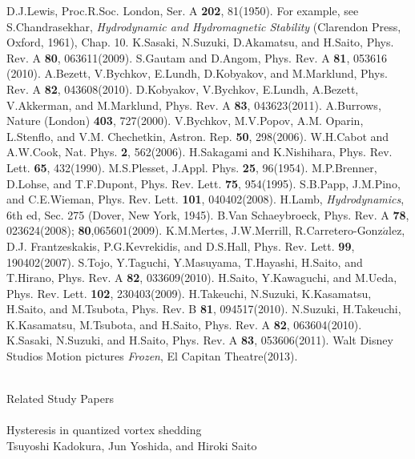 \documentclass[12pt,a4paper]{jbook}
\begin{document}
\begin{thebibliography}{81}
 D.J.Lewis, Proc.R.Soc. London, Ser. A {\bf 202}, 81(1950).
 For example, see S.Chandrasekhar, {\it Hydrodynamic and Hydromagnetic Stability} (Clarendon Press, Oxford, 1961), Chap. 10.
 K.Sasaki, N.Suzuki, D.Akamatsu, and H.Saito, Phys. Rev. A {\bf 80}, 063611(2009).
 S.Gautam and D.Angom, Phys. Rev. A {\bf 81}, 053616 (2010).
 A.Bezett, V.Bychkov, E.Lundh, D.Kobyakov, and M.Marklund, Phys. Rev. A {\bf 82}, 043608(2010).
 D.Kobyakov, V.Bychkov, E.Lundh, A.Bezett, V.Akkerman, and M.Marklund, Phys. Rev. A {\bf 83}, 043623(2011).
 A.Burrows, Nature (London) {\bf 403}, 727(2000).
 V.Bychkov, M.V.Popov, A.M. Oparin, L.Stenflo, and V.M. Chechetkin, Astron. Rep. {\bf 50}, 298(2006).
 W.H.Cabot and A.W.Cook, Nat. Phys. {\bf 2}, 562(2006).
 H.Sakagami and K.Nishihara, Phys. Rev. Lett. {\bf 65}, 432(1990).
 M.S.Plesset, J.Appl. Phys. {\bf 25}, 96(1954).
 M.P.Brenner, D.Lohse, and T.F.Dupont, Phys. Rev. Lett. {\bf 75}, 954(1995).
 S.B.Papp, J.M.Pino, and C.E.Wieman, Phys. Rev. Lett. {\bf 101}, 040402(2008).
 H.Lamb, {\it Hydrodynamics}, 6th ed, Sec. 275 (Dover, New York, 1945).
 B.Van Schaeybroeck, Phys. Rev. A {\bf 78}, 023624(2008); {\bf 80},065601(2009).
 K.M.Mertes, J.W.Merrill, R.Carretero-Gonz$\acute{a}$lez, D.J. Frantzeskakis, P.G.Kevrekidis, and D.S.Hall, Phys. Rev. Lett. {\bf 99}, 190402(2007).
 S.Tojo, Y.Taguchi, Y.Masuyama, T.Hayashi, H.Saito, and T.Hirano, Phys. Rev. A {\bf 82}, 033609(2010).
 H.Saito, Y.Kawaguchi, and M.Ueda, Phys. Rev. Lett. {\bf 102}, 230403(2009).
 H.Takeuchi, N.Suzuki, K.Kasamatsu, H.Saito, and M.Tsubota, Phys. Rev. B {\bf 81}, 094517(2010).
 N.Suzuki, H.Takeuchi, K.Kasamatsu, M.Tsubota, and H.Saito, Phys. Rev. A {\bf 82}, 063604(2010).
 K.Sasaki, N.Suzuki, and H.Saito, Phys. Rev. A {\bf 83}, 053606(2011).
 Walt Disney Studios Motion pictures {\it Frozen}, El Capitan Theatre(2013).
\end{thebibliography}
\newpage
\
\\
Related Study Papers
\\
\\
Hysteresis in quantized vortex shedding
\\
Tsuyoshi Kadokura, Jun Yoshida, and Hiroki Saito
\\
\end{document}
